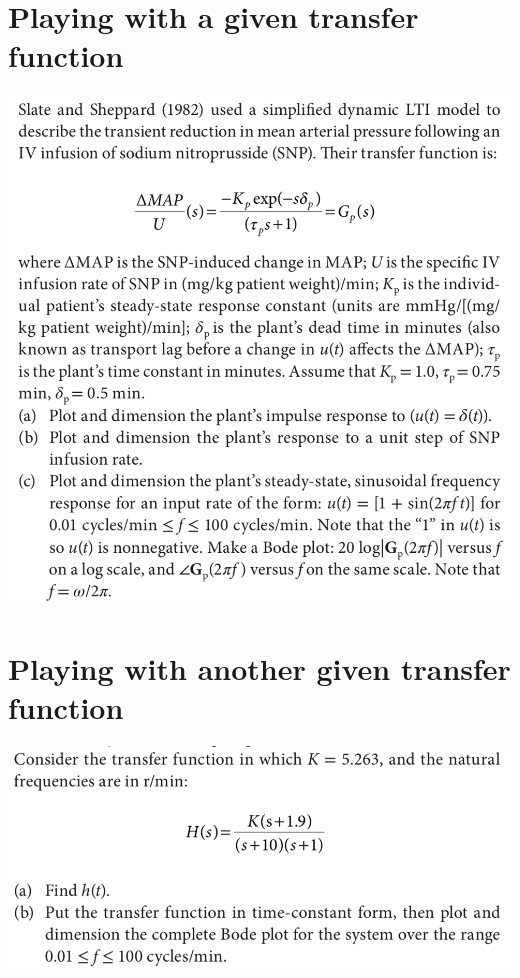 \documentclass[11pt]{book}
\begin{document}
\newpage

\section{Playing with a given transfer function}
\begin{center}
	\includegraphics[width=\textwidth]{figures/q3.01.png}
\end{center}


\section{Playing with another given transfer function}
\begin{center}
	\includegraphics[width=\textwidth]{figures/q3.02.png}
\end{center}
\end{document}
